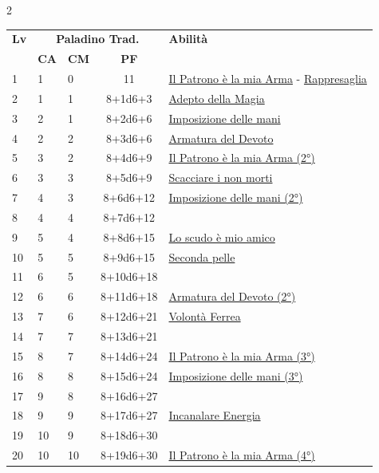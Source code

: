 {\begin{multicols}{2}

\noindent\begin{tabularx}{\linewidth}{p{0.55cm}|p{0.55cm}p{0.55cm}c|X|}
	\toprule
 \rowcolor{gray!20}	\textbf{Lv} & \multicolumn{3}{c|}{\textbf{Paladino Trad.}} & \textbf{Abilità} \\
& \centering\arraybackslash \textbf{CA} & \centering\arraybackslash \textbf{CM} & \centering\arraybackslash \textbf{PF} & \\
	\toprule
	1 & 1 & 0 & 11 & \hyperlink{Il Patrono è la mia Arma}{Il Patrono è la mia Arma} - \hyperlink{Rappresaglia}{Rappresaglia}\\
	\rowcolor{gray!20}2 & 1 & 1 & 8+1d6+3 & \hyperlink{Adepto della Magia}{Adepto della Magia}\\
	3 & 2 & 1 & 8+2d6+6 & \hyperlink{Imposizione delle mani}{Imposizione delle mani}\\
	\rowcolor{gray!20}4 & 2 & 2 & 8+3d6+6 & \hyperlink{Armatura del Devoto}{Armatura del Devoto}\\
	5 & 3 & 2 & 8+4d6+9 & \hyperlink{Il Patrono è la mia Arma}{Il Patrono è la mia Arma (2°)}\\
	\rowcolor{gray!20}6 & 3 & 3 & 8+5d6+9 & \hyperlink{Scacciare i non morti}{Scacciare i non morti}\\
	7 & 4 & 3 & 8+6d6+12 & \hyperlink{Imposizione delle mani}{Imposizione delle mani (2°)}\\
	\rowcolor{gray!20}8 & 4 & 4 & 8+7d6+12 & \\
	9 & 5 & 4 & 8+8d6+15 & \hyperlink{Lo scudo è mio amico}{Lo scudo è mio amico}\\
	\rowcolor{gray!20}10 & 5 & 5 & 8+9d6+15 & \hyperlink{Seconda pelle}{Seconda pelle}\\
	11 & 6 & 5 & 8+10d6+18 & \\
	\rowcolor{gray!20}12 & 6 & 6 & 8+11d6+18 & \hyperlink{Armatura del Devoto}{Armatura del Devoto (2°)}\\
	13 & 7 & 6 & 8+12d6+21 & \hyperlink{Volonta' Ferrea}{Volontà Ferrea}\\
	\rowcolor{gray!20}14 & 7 & 7 & 8+13d6+21 & \\
	15 & 8 & 7 & 8+14d6+24 & \hyperlink{Il Patrono è la mia Arma}{Il Patrono è la mia Arma (3°)}\\
	\rowcolor{gray!20}16 & 8 & 8 & 8+15d6+24 & \hyperlink{Imposizione delle mani}{Imposizione delle mani (3°)}\\
	17 & 9 & 8 & 8+16d6+27 & \\
	\rowcolor{gray!20}18 & 9 & 9 & 8+17d6+27 & \hyperlink{Incanalare Energia}{Incanalare Energia}\\
	19 & 10 & 9 & 8+18d6+30 & \\
	\rowcolor{gray!20}20 & 10 & 10 & 8+19d6+30 & \hyperlink{Il Patrono è la mia Arma}{Il Patrono è la mia Arma (4°)}\\
\end{tabularx}


\end{multicols}}
